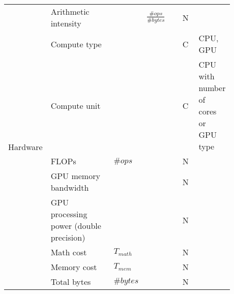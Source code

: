 \begin{tabular}{lp{0.35\linewidth}p{0.10\linewidth}>{\footnotesize}p{0.2\linewidth}p{0.08\linewidth}p{0.15\linewidth}}
    \multirow[t]{9}{*}{Hardware}           & Arithmetic intensity                    &                                   & $\frac{\#ops}{\#bytes}$                 & N    &                                      \\
                                           & Compute type                            &                                   &                                         & C    & CPU, GPU                             \\
                                           & Compute unit                            &                                   &                                         & C    & CPU with number of cores or GPU type \\
                                           & FLOPs                                   & $\#ops$                           &                                         & N    &                                      \\
                                           & GPU memory bandwidth                    &                                   &                                         & N    &                                      \\
                                           & GPU processing power (double precision) &                                   &                                         & N    &                                      \\
                                           & Math cost                               & $T_{math}$                        &                                         & N    &                                      \\
                                           & Memory cost                             & $T_{mem}$                         &                                         & N    &                                      \\
                                           & Total bytes                             & $\#bytes$                         &                                         & N    &                                      \\


\end{tabular}
